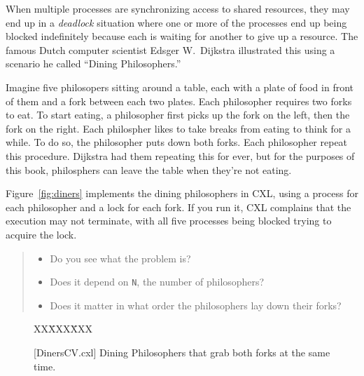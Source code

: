 \documentclass{report}
\newcommand{\cxlsource}[1]{
\begin{tabbing}
XX\=XXX\=XXX\kill
    
\end{tabbing}
}
\newenvironment{code}{
\tcolorbox
}{
\endtcolorbox
}
\begin{document}
When multiple processes are synchronizing access to shared resources, they
may end up in a \emph{deadlock} situation where one or more of the processes
end up being blocked indefinitely because each is waiting for another to give
up a resource.
The famous Dutch computer scientist Edsger W.~Dijkstra illustrated this using
a scenario he called ``Dining Philosophers.''

Imagine five philosopers sitting around a table, each with a plate of food in
front of them and a fork between each two plates.  Each philosopher requires
two forks to eat.  To start eating, a philosopher first picks up the fork on
the left, then the fork on the right.  Each philospher likes to take breaks
from eating to think for a while.  To do so, the philosopher puts down both
forks.  Each philosopher repeat this procedure.  Dijkstra had them repeating
this for ever, but for the purposes of this book, philosphers can leave
the table when they're not eating.

Figure~\ref{fig:diners} implements the dining philosophers in CXL, using a
process for each philosopher and a lock for each fork.  If you
run it, CXL complains that the execution may not terminate, with all five
processes being blocked trying to acquire the lock.

\begin{quote}
\begin{itemize}
\item Do you see what the problem is?
\item Does it depend on \texttt{N}, the number of philosophers?
\item Does it matter in what order the philosophers lay down their forks?
\end{itemize}
\end{quote}


\begin{figure}
\begin{code}
\cxlsource{DinersCV}
\end{code}
\caption{[DinersCV.cxl] Dining Philosophers that grab both forks at the same time.}
\label{fig:dinerscv}
\end{figure}
\end{document}
